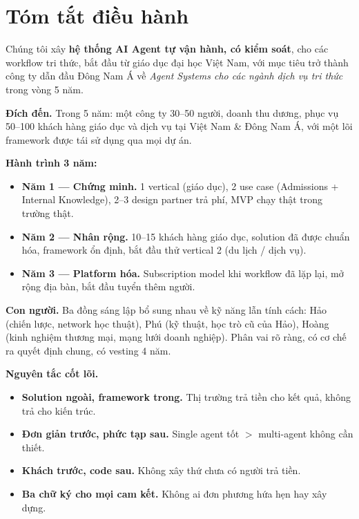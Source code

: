 \documentclass[11pt,a4paper]{article}
\begin{document}
\section*{Tóm tắt điều hành}

\begin{keybox}[title=Một câu duy nhất mô tả công ty]
Chúng tôi xây \textbf{hệ thống AI Agent tự vận hành, có kiểm soát}, cho các
workflow tri thức, bắt đầu từ giáo dục đại học Việt Nam, với mục tiêu trở thành
công ty dẫn đầu Đông Nam Á về \textit{Agent Systems cho các ngành dịch vụ tri thức}
trong vòng 5 năm.
\end{keybox}

\textbf{Đích đến.} Trong 5 năm: một công ty 30--50 người, doanh thu dương, phục vụ
50--100 khách hàng giáo dục và dịch vụ tại Việt Nam \& Đông Nam Á, với một lõi
framework được tái sử dụng qua mọi dự án.

\textbf{Hành trình 3 năm:}
\begin{itemize}
\item \textbf{Năm 1 — Chứng minh.} 1 vertical (giáo dục), 2 use case (Admissions +
Internal Knowledge), 2--3 design partner trả phí, MVP chạy thật trong trường thật.
\item \textbf{Năm 2 — Nhân rộng.} 10--15 khách hàng giáo dục, solution đã được
chuẩn hóa, framework ổn định, bắt đầu thử vertical 2 (du lịch / dịch vụ).
\item \textbf{Năm 3 — Platform hóa.} Subscription model khi workflow đã lặp lại,
mở rộng địa bàn, bắt đầu tuyển thêm người.
\end{itemize}

\textbf{Con người.} Ba đồng sáng lập bổ sung nhau về kỹ năng lẫn tính cách:
Hảo (chiến lược, network học thuật), Phú (kỹ thuật, học trò cũ của Hảo), Hoàng
(kinh nghiệm thương mại, mạng lưới doanh nghiệp). Phân vai rõ ràng, có cơ chế
ra quyết định chung, có vesting 4 năm.

\textbf{Nguyên tắc cốt lõi.}
\begin{itemize}
\item \textbf{Solution ngoài, framework trong.} Thị trường trả tiền cho kết quả, không trả cho kiến trúc.
\item \textbf{Đơn giản trước, phức tạp sau.} Single agent tốt $>$ multi-agent không cần thiết.
\item \textbf{Khách trước, code sau.} Không xây thứ chưa có người trả tiền.
\item \textbf{Ba chữ ký cho mọi cam kết.} Không ai đơn phương hứa hẹn hay xây dựng.
\end{itemize}
\clearpage
\end{document}
